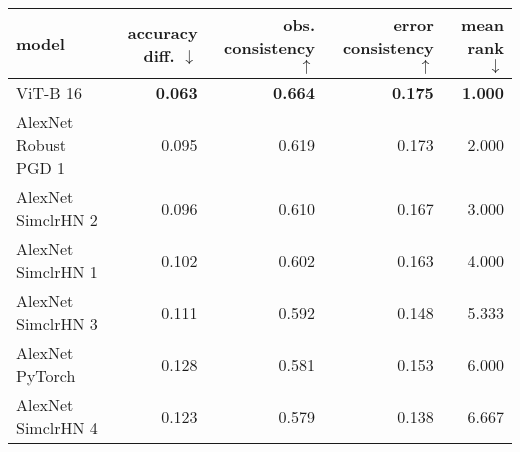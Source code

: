 \begin{tabular}{lrrrr}
\toprule
model & accuracy diff. $\downarrow$ & obs. consistency $\uparrow$ & error consistency $\uparrow$ & mean rank $\downarrow$ \\
\midrule
ViT-B 16 & \textbf{0.063} & \textbf{0.664} & \textbf{0.175} & \textbf{1.000} \\
AlexNet Robust PGD 1 & 0.095 & 0.619 & 0.173 & 2.000 \\
AlexNet SimclrHN 2 & 0.096 & 0.610 & 0.167 & 3.000 \\
AlexNet SimclrHN 1 & 0.102 & 0.602 & 0.163 & 4.000 \\
AlexNet SimclrHN 3 & 0.111 & 0.592 & 0.148 & 5.333 \\
AlexNet PyTorch & 0.128 & 0.581 & 0.153 & 6.000 \\
AlexNet SimclrHN 4 & 0.123 & 0.579 & 0.138 & 6.667 \\
\bottomrule
\end{tabular}

